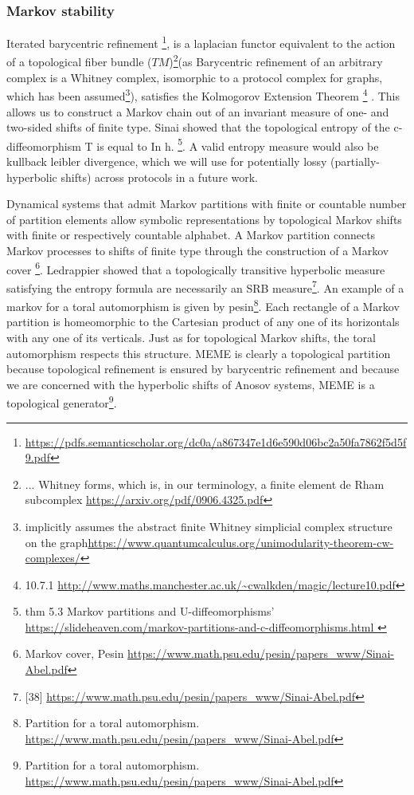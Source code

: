 \documentclass{article}
\begin{document}
\subsubsection{Markov stability}
Iterated barycentric refinement \footnote{\url{https://pdfs.semanticscholar.org/dc0a/a867347e1d6e590d06bc2a50fa7862f5d5f9.pdf}}, is a laplacian functor equivalent to the action of a topological fiber bundle ($TM$)\footnote{ ... Whitney forms, which is, in our terminology, a finite element de Rham subcomplex \url{https://arxiv.org/pdf/0906.4325.pdf}}(as Barycentric refinement of an arbitrary complex is a Whitney complex, isomorphic to a protocol complex for graphs, which has been assumed\footnote{implicitly assumes the abstract finite Whitney simplicial complex structure on the graph\url{https://www.quantumcalculus.org/unimodularity-theorem-cw-complexes/}}), satisfies the Kolmogorov Extension Theorem \footnote{10.7.1 \url{http://www.maths.manchester.ac.uk/~cwalkden/magic/lecture10.pdf}} . This allows us to construct a Markov chain out of an invariant measure of one- and two-sided shifts of finite type. Sinai showed that the topological entropy of the c-diffeomorphism T is equal to In h. \footnote{thm 5.3 Markov partitions and U-diffeomorphisms' \url{https://slideheaven.com/markov-partitions-and-c-diffeomorphisms.html }}. A valid entropy measure would also be kullback leibler divergence, which we will use for potentially lossy (partially-hyperbolic shifts) across protocols in a future work.

Dynamical systems that admit Markov partitions with finite or countable number of partition elements allow symbolic representations by topological Markov shifts with finite or respectively countable alphabet. A Markov partition connects Markov processes to shifts of finite type through the construction of a Markov cover \footnote{Markov cover, Pesin \url{https://www.math.psu.edu/pesin/papers_www/Sinai-Abel.pdf}}. Ledrappier showed that a topologically transitive hyperbolic measure satisfying the entropy formula are necessarily an SRB measure\footnote{[38] \url{https://www.math.psu.edu/pesin/papers_www/Sinai-Abel.pdf}}. An example of a markov for a toral automorphism is given by pesin\footnote{Partition for a toral automorphism. \url{https://www.math.psu.edu/pesin/papers_www/Sinai-Abel.pdf}}. Each rectangle of a Markov partition is homeomorphic to the Cartesian product of any one of its horizontals with any one of its verticals. Just as for topological Markov shifts, the toral automorphism respects this structure. MEME is clearly a topological partition because topological refinement is ensured by barycentric refinement and because we are concerned with the hyperbolic shifts of Anosov systems, MEME is a topological generator\footnote{Partition for a toral automorphism. \url{https://www.math.psu.edu/pesin/papers_www/Sinai-Abel.pdf}}.
\end{document}
